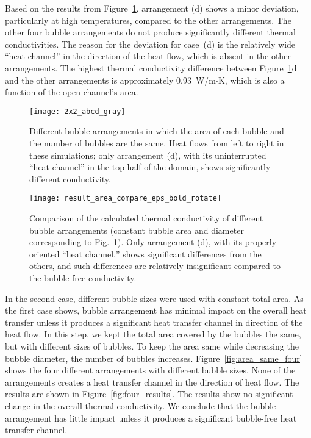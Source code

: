 Based on the results from Figure~\ref{fig:five_figures}, arrangement (d) shows a minor deviation, particularly at high temperatures, compared to the other arrangements. The other four bubble arrangements do not produce significantly different thermal conductivities. The reason for the deviation for case~(d) is the relatively wide ``heat channel'' in the direction of the heat flow, which is absent in the other arrangements. The highest thermal conductivity difference between Figure~\ref{fig:five_figures}d and the other arrangements is approximately 0.93~W/m$\cdot$K, which is also a function of the open channel's area.

\begin{figure}
	\centering
	\texttt{[image: 2x2\_abcd\_gray]}
    \caption[Different bubble arrangements in which the area of each bubble and
      the number of bubbles are the same]{Different bubble arrangements in which the area of each bubble and
      the number of bubbles are the same. Heat flows from left to right in
      these simulations; only arrangement (d), with its uninterrupted ``heat
      channel'' in the top half of the domain, shows significantly different
      conductivity.}
	\label{fig:five_figures} 
\end{figure}

\begin{figure}
	\centering
	\texttt{[image: result\_area\_compare\_eps\_bold\_rotate]}
    \caption[Comparison of the calculated thermal conductivity of different
        bubble arrangements (constant bubble area and diameter corresponding to Fig.~\ref{fig:five_figures}). ]{Comparison of the calculated thermal conductivity of different
        bubble arrangements (constant bubble area and diameter corresponding to Fig.~\ref{fig:five_figures}). Only
        arrangement (d), with its properly-oriented ``heat channel,'' shows significant
        differences from the others, and such differences are relatively
        insignificant compared to the bubble-free conductivity.}
	\label{fig:five_results}
\end{figure}

In the second case, different bubble sizes were used with constant total area. As the first case shows, bubble arrangement has minimal impact on the overall heat transfer unless it produces a significant heat transfer channel in direction of the heat flow. In this step, we kept the total area covered by the bubbles the same, but with different sizes of bubbles. To keep the area same while decreasing the bubble diameter, the number of bubbles increases. Figure~\ref{fig:area_same_four} shows the four different arrangements with different bubble sizes. None of the arrangements creates a heat transfer channel in the direction of heat flow. The results are shown in Figure~\ref{fig:four_results}. The results show no significant change in the overall thermal conductivity. We conclude that the bubble arrangement has little impact unless it produces a significant bubble-free heat transfer channel. 

